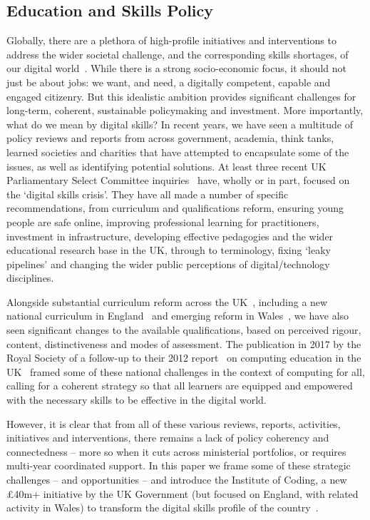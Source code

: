 \documentclass[conference]{IEEEtran}
\begin{document}
\subsection{Education and Skills Policy}

Globally, there are a plethora of high-profile initiatives and
interventions to address the wider societal challenge, and the
corresponding skills shortages, of our digital
world~\cite{cece:2017}. While there is a strong socio-economic focus,
it should not just be about jobs: we want, and need, a digitally
competent, capable and engaged citizenry. But this idealistic ambition
provides significant challenges for long-term, coherent, sustainable
policymaking and investment. More importantly, what do we mean by
digital skills? In recent years, we have seen a multitude of policy
reviews and reports from across government, academia, think tanks,
learned societies and charities that have attempted to encapsulate
some of the issues, as well as identifying potential solutions. At
least three recent UK Parliamentary Select Committee
inquiries~\cite{ukholds:2015,ukhocst:2016,ukholc:2017} have, wholly or
in part, focused on the `digital skills crisis'. They have all made a
number of specific recommendations, from curriculum and qualifications
reform, ensuring young people are safe online, improving professional
learning for practitioners, investment in infrastructure, developing
effective pedagogies and the wider educational research base in the
UK, through to terminology, fixing `leaky pipelines' and changing the
wider public perceptions of digital/technology disciplines.

Alongside substantial curriculum reform across the
UK~\cite{crick+sentance:2011,brown-et-al:sigcse2013,brown-et-al:toce2014},
including a new national curriculum in England~\cite{DfE2013a} and
emerging reform in
Wales~\cite{wgictreview:2013,crick+beauchamp:bera2017,moller+crick:jce2018},
we have also seen significant changes to the available qualifications,
based on perceived rigour, content, distinctiveness and modes of
assessment. The publication in 2017 by the Royal Society of a follow-up
to their 2012 report~\cite{rs:2012} on computing education in the
UK~\cite{rs:2017} framed some of these national challenges in the
context of computing for all, calling for a coherent strategy so that
all learners are equipped and empowered with the necessary skills to
be effective in the digital world.

However, it is clear that from all of these various reviews, reports,
activities, initiatives and interventions, there remains a lack of
policy coherency and connectedness -- more so when it cuts across
ministerial portfolios, or requires multi-year coordinated support. In
this paper we frame some of these strategic challenges -- and
opportunities -- and introduce the Institute of Coding, a new
\pounds40m+ initiative by the UK Government (but focused on England,
with related activity in Wales) to transform the digital skills
profile of the country~\cite{davenport-et-al:cep2019}.
\end{document}
